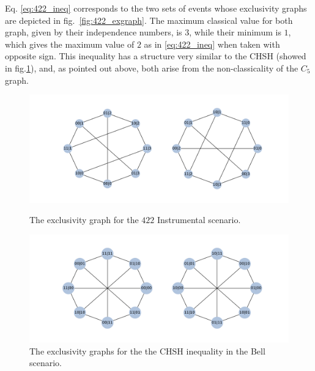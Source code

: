 \documentclass[letterpaper]{article}
\begin{document}
Eq. \ref{eq:422_ineq} corresponds to the two sets of events whose
exclusivity graphs are depicted in fig.~\ref{fig:422_exgraph}.
The maximum classical value for both graph, given by their independence numbers, is $3$, while their minimum is $1$, which gives the maximum value of $2$
as in \eqref{eq:422_ineq} when taken with opposite sign.
This inequality has a structure very similar to the CHSH (showed in
fig.\ref{fig:chsh_exgraph}), and, as pointed out above, both arise from the
non-classicality of the $C_5$ graph.

\begin{figure}[b]
    \centering
    \parbox{.9\columnwidth}{
        \includegraphics[width=\columnwidth]{images/422_exgraph.pdf}
        \caption{The exclusivity graph for the $422$ Instrumental scenario.}
        \label{fig:422_exgraph}
    }

    \bigskip
    \parbox{.9\columnwidth}{
        \includegraphics[width=\columnwidth]{images/gclmp_graphs.pdf}
        \caption{The exclusivity graphs for the the CHSH inequality in the Bell
        scenario.}
        \label{fig:chsh_exgraph}
    }
\end{figure}
\end{document}
